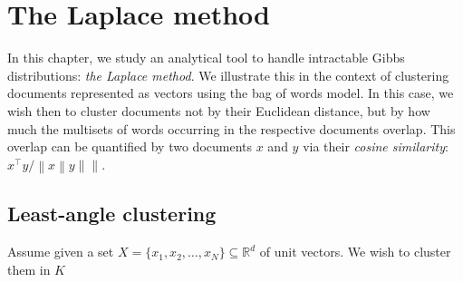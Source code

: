 \chapter{The Laplace method}
\label{ch:laplace}

In this chapter, we study an analytical tool to handle intractable Gibbs distributions: \emph{the Laplace method}. We illustrate this in the context of clustering documents represented as vectors using the bag of words model. In this case, we wish then to cluster documents not by their Euclidean distance, but by how much the multisets of words occurring in the respective documents overlap. This overlap can be quantified by two documents $x$ and $y$ via their \emph{cosine similarity}: $x^\top y / \left\|x\right\|y\left\|\right\|$.

\section{Least-angle clustering}

Assume given a set $X = \{x_1, x_2, \ldots, x_N\} \subseteq \mathbb{R}^d$ of unit vectors. We wish to cluster them in $K$
